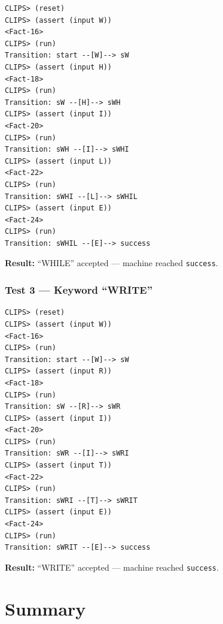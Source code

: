 \documentclass[12pt,a4paper]{article}
\begin{document}
\begin{lstlisting}[style=terminalStyle]
CLIPS> (reset)
CLIPS> (assert (input W))
<Fact-16>
CLIPS> (run)
Transition: start --[W]--> sW
CLIPS> (assert (input H))
<Fact-18>
CLIPS> (run)
Transition: sW --[H]--> sWH
CLIPS> (assert (input I))
<Fact-20>
CLIPS> (run)
Transition: sWH --[I]--> sWHI
CLIPS> (assert (input L))
<Fact-22>
CLIPS> (run)
Transition: sWHI --[L]--> sWHIL
CLIPS> (assert (input E))
<Fact-24>
CLIPS> (run)
Transition: sWHIL --[E]--> success
\end{lstlisting}

\begin{successbox}
\textbf{Result:} ``WHILE'' accepted --- machine reached \texttt{success}. \checkmark
\end{successbox}

\subsubsection*{Test 3 --- Keyword ``WRITE''}

\begin{lstlisting}[style=terminalStyle]
CLIPS> (reset)
CLIPS> (assert (input W))
<Fact-16>
CLIPS> (run)
Transition: start --[W]--> sW
CLIPS> (assert (input R))
<Fact-18>
CLIPS> (run)
Transition: sW --[R]--> sWR
CLIPS> (assert (input I))
<Fact-20>
CLIPS> (run)
Transition: sWR --[I]--> sWRI
CLIPS> (assert (input T))
<Fact-22>
CLIPS> (run)
Transition: sWRI --[T]--> sWRIT
CLIPS> (assert (input E))
<Fact-24>
CLIPS> (run)
Transition: sWRIT --[E]--> success
\end{lstlisting}

\begin{successbox}
\textbf{Result:} ``WRITE'' accepted --- machine reached \texttt{success}. \checkmark
\end{successbox}

\newpage
\section*{Summary}
\end{document}
